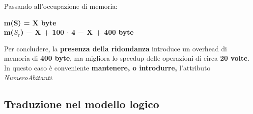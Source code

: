 \documentclass{article}
\begin{document}
Passando all'occupazione di memoria:
\begin{center}
    \textbf{m(S) = X byte}\vspace{10pt}\\
    \textbf{m($S_r$) = X + 100 $\cdot$ 4 = X + 400 byte}
\end{center}
Per concludere, la \textbf{presenza della ridondanza} introduce un overhead di memoria di \textbf{400 byte}, ma migliora lo speedup delle operazioni di circa \textbf{20 volte}.\\
In questo caso è conveniente \textbf{mantenere, o introdurre,} l'attributo \textit{NumeroAbitanti}.

\subsection*{Traduzione nel modello logico}
\large
\end{document}
